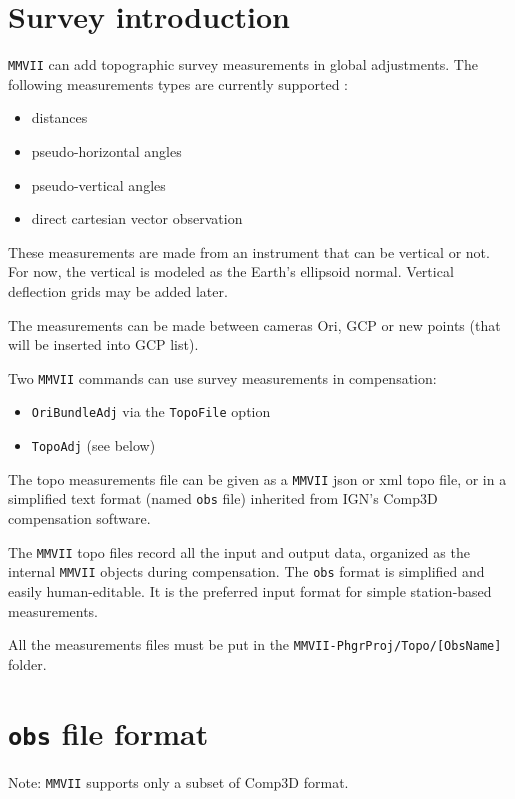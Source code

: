 \section{Survey introduction}

{\tt MMVII} can add topographic survey measurements in global adjustments.
The following measurements types are currently supported :

\begin{itemize}
    \item distances
    \item pseudo-horizontal angles
    \item pseudo-vertical angles
    \item direct cartesian vector observation
\end{itemize}

These measurements are made from an instrument that can be vertical or not.
For now, the vertical is modeled as the Earth's ellipsoid normal. Vertical deflection grids may be added later.

The measurements can be made between cameras Ori, GCP or new points (that will be inserted into GCP list).

Two {\tt MMVII} commands can use survey measurements in compensation:
\begin{itemize}
    \item {\tt OriBundleAdj} via the {\tt TopoFile} option
    \item {\tt TopoAdj} (see below)
\end{itemize}

The topo measurements file can be given as a {\tt MMVII} json or xml topo file, or in a simplified text format (named {\tt obs} file) inherited from IGN's Comp3D compensation software.

The {\tt MMVII} topo files record all the input and output data, organized as the internal {\tt MMVII} objects during compensation.
The {\tt obs} format is simplified and easily human-editable. It is the preferred input format for simple station-based measurements.

All the measurements files must be put in the {\tt MMVII-PhgrProj/Topo/[ObsName]} folder.

\section{{\tt obs} file format}
\label{sec:compObsFormat}
Note: {\tt MMVII} supports only a subset of Comp3D format.

